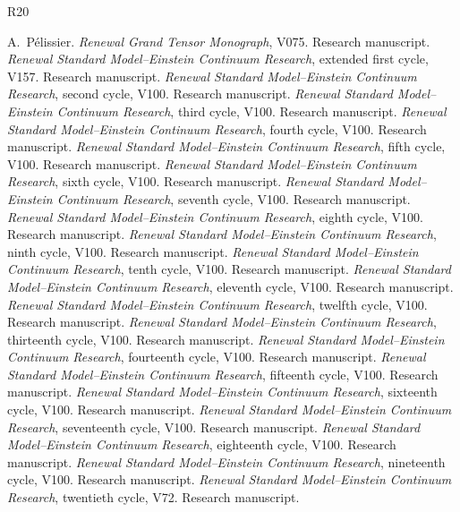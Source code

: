\documentclass[11pt,a4paper,oneside]{book}
\theoremstyle{plain}
\theoremstyle{definition}
\theoremstyle{remark}
\begin{document}
\backmatter
\begingroup\small
\begin{thebibliography}{R20}
\setlength{\itemsep}{0pt}
\setlength{\parsep}{0pt}
\setlength{\parskip}{0pt}
 A.\ P\'elissier. \emph{Renewal Grand Tensor Monograph}, V075. Research manuscript.
 \emph{Renewal Standard Model--Einstein Continuum Research}, extended first cycle, V157. Research manuscript.
 \emph{Renewal Standard Model--Einstein Continuum Research}, second cycle, V100. Research manuscript.
 \emph{Renewal Standard Model--Einstein Continuum Research}, third cycle, V100. Research manuscript.
 \emph{Renewal Standard Model--Einstein Continuum Research}, fourth cycle, V100. Research manuscript.
 \emph{Renewal Standard Model--Einstein Continuum Research}, fifth cycle, V100. Research manuscript.
 \emph{Renewal Standard Model--Einstein Continuum Research}, sixth cycle, V100. Research manuscript.
 \emph{Renewal Standard Model--Einstein Continuum Research}, seventh cycle, V100. Research manuscript.
 \emph{Renewal Standard Model--Einstein Continuum Research}, eighth cycle, V100. Research manuscript.
 \emph{Renewal Standard Model--Einstein Continuum Research}, ninth cycle, V100. Research manuscript.
 \emph{Renewal Standard Model--Einstein Continuum Research}, tenth cycle, V100. Research manuscript.
 \emph{Renewal Standard Model--Einstein Continuum Research}, eleventh cycle, V100. Research manuscript.
 \emph{Renewal Standard Model--Einstein Continuum Research}, twelfth cycle, V100. Research manuscript.
 \emph{Renewal Standard Model--Einstein Continuum Research}, thirteenth cycle, V100. Research manuscript.
 \emph{Renewal Standard Model--Einstein Continuum Research}, fourteenth cycle, V100. Research manuscript.
 \emph{Renewal Standard Model--Einstein Continuum Research}, fifteenth cycle, V100. Research manuscript.
 \emph{Renewal Standard Model--Einstein Continuum Research}, sixteenth cycle, V100. Research manuscript.
 \emph{Renewal Standard Model--Einstein Continuum Research}, seventeenth cycle, V100. Research manuscript.
 \emph{Renewal Standard Model--Einstein Continuum Research}, eighteenth cycle, V100. Research manuscript.
 \emph{Renewal Standard Model--Einstein Continuum Research}, nineteenth cycle, V100. Research manuscript.
 \emph{Renewal Standard Model--Einstein Continuum Research}, twentieth cycle, V72. Research manuscript.
\end{thebibliography}
\endgroup
\end{document}
